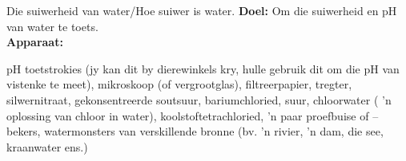             \begin{g_experiment}{Die suiwerheid van water/Hoe suiwer is water.}
            \nopagebreak
            \label{m38138*id08341}\noindent{}\textbf{Doel:}\newline
Om die suiwerheid en pH van water te toets.
\\
\label{m38138*id083244}\noindent{}\textbf{Apparaat:}\\
\begin{minipage}{.5\textwidth}
pH toetstrokies (jy kan dit by dierewinkels kry, hulle gebruik dit om die pH van vistenke te meet), mikroskoop (of vergrootglas), filtreerpapier, tregter, silwernitraat, gekonsentreerde soutsuur, bariumchloried, suur, chloorwater ( 'n oplossing van chloor in water), koolstoftetrachloried,  'n paar proefbuise of –bekers, watermonsters van verskillende bronne (bv.  'n rivier,  'n dam, die see, kraanwater ens.)
\end{minipage}
\begin{minipage}{.5\textwidth}


\end{minipage}
\end{g_experiment}
